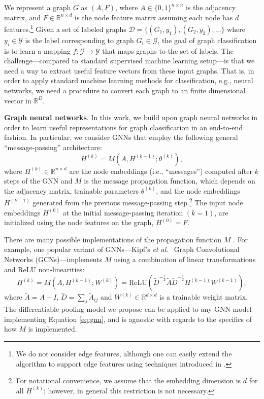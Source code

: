 \documentclass{article}
\newcommand{\xhdr}[1]{{\noindent\bfseries #1}.}
\newcommand{\etal}{\textit{et al}.~}
\begin{document}
We represent a graph $G$ as $(A,F)$, where $A\in \{0, 1\}^{n\times n}$ is the adjacency matrix, and $F \in \mathbb{R}^{n\times d}$ is the node feature matrix assuming each node has $d$ features.\footnote{We do not consider edge features, although one can easily extend the algorithm to support edge features using techniques introduced in \cite{simonovsky2017dynamic}.}
Given a set of labeled graphs $\mathcal{D}=\{(G_1,y_1),(G_2,y_2),...\}$ where $y_i \in \mathcal{Y}$ is the label corresponding to graph $G_i \in \mathcal{G}$, the goal of graph classification is to learn a mapping $f : \mathcal{G} \to \mathcal{Y}$ that maps graphs to the set of labels. 
The challenge---compared to standard supervised machine learning setup---is that we need a way to extract useful feature vectors from these input graphs.
That is, in order to apply standard machine learning methods for classification, e.g., neural networks, we need a procedure to convert each graph to an finite dimensional vector in $\mathbb{R}^D$.



\xhdr{Graph neural networks}
In this work, we build upon graph neural networks in order to learn useful representations for graph classification in an end-to-end fashion. 
In particular, we consider GNNs that employ the following general ``message-passing'' architecture:
\begin{equation}\label{eq:gnn}
     H^{(k)} = M(A,H^{(k-1)};\theta^{(k)}),
\end{equation}
where $H^{(k)} \in \mathbb{R}^{n \times d}$ are the node embeddings (i.e., ``messages'') computed after $k$ steps of the GNN and $M$ is the message propagation function, which depends on the adjacency matrix, trainable parameters $\theta^{(k)}$, and the node embeddings $H^{(k-1)}$ generated from the previous message-passing step.\footnote{For notational convenience, we assume that the embedding dimension is $d$ for all $H^{(k)}$; however, in general this restriction is not necessary.}
The input node embeddings $H^{(0)}$ at the initial message-passing iteration $(k=1)$, are initialized using
the node features on the graph, $H^{(0)} = F$. 

There are many possible implementations of the propagation function $M$ \cite{Gil+2017,hamilton2017inductive}.
For example, one popular variant of GNNs---Kipf's \etal \cite{kipf2017semi} Graph Convolutional Networks (GCNs)---implements $M$ using a combination of linear transformations and ReLU non-linearities:
\begin{equation}
    \label{eq:gcn}
    H^{(k)} =  M(A,H^{(k-1)};W^{(k)}) = \textrm{ReLU}(\tilde{D}^{-\frac{1}{2}}\tilde{A}\tilde{D}^{-\frac{1}{2}} H^{(k-1)} W^{(k-1)}),
\end{equation}
where $\tilde{A}=A+I$, $\tilde{D}=\sum_j\tilde{A}_{ij}$ and $W^{(k)} \in \mathbb{R}^{d \times d}$ is a trainable weight matrix.
The differentiable pooling model we propose can be applied to any GNN model implementing Equation \eqref{eq:gnn}, and is agnostic with regards to the specifics of how $M$ is implemented. 
\end{document}
